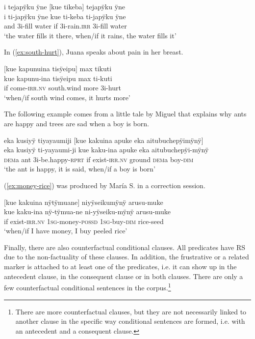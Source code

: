 \ea\label{ex:kuekue}
\begingl
\glpreamble i tejapÿku ÿne \textup{[}kue tikeba\textup{]} tejapÿku ÿne\\
\gla i ti-japÿku ÿne kue ti-keba ti-japÿku ÿne\\
\glb and 3i-fill water if 3i-rain.\textsc{irr} 3i-fill water\\
\glft ‘the water fills it there, when/if it rains, the water fills it’
\endgl
\trailingcitation{[jxx-p151020l-2]}
\xe

In (\ref{ex:south-hurt}), Juana speaks about pain in her breast. 

\ea\label{ex:south-hurt}
\begingl
\glpreamble \textup{[}kue kapunuina tisÿeipu\textup{]} max tikuti\\
\gla kue kapunu-ina tisÿeipu max ti-kuti\\
\glb if come-\textsc{irr.nv} south.wind more 3i-hurt\\
\glft ‘when/if south wind comes, it hurts more’
\endgl
\trailingcitation{[jxx-p120430l-1.326]}
\xe

The following example comes from a little tale by Miguel that explains why ants are happy and trees are sad when a boy is born.

\newpage
\ea\label{ex:happy-born}
\begingl
\glpreamble eka kusiyÿ tiyayaumiji \textup{[}kue kakuina apuke eka aitubuchepÿimÿnÿ\textup{]}\\
\gla eka kusiyÿ ti-yayaumi-ji kue kaku-ina apuke eka aitubuchepÿi-mÿnÿ\\
\glb \textsc{dem}a ant 3i-be.happy-\textsc{rprt} if exist-\textsc{irr.nv} ground \textsc{dem}a boy-\textsc{dim}\\
\glft ‘the ant is happy, it is said, when/if a boy is born’
\endgl
{}
\xe

(\ref{ex:money-rice}) was produced by María S. in a correction session.

\ea\label{ex:money-rice}
\begingl
\glpreamble \textup{[}kue kakuina nÿtÿmuane\textup{]} niyÿseikumÿnÿ arusu-muke\\
\gla kue kaku-ina nÿ-tÿmua-ne ni-yÿseiku-mÿnÿ arusu-muke\\
\glb if exist-\textsc{irr.nv} 1\textsc{sg}-money-\textsc{possd} 1\textsc{sg}-buy-\textsc{dim} rice-seed\\
\glft ‘when/if I have money, I buy peeled rice’
\endgl
\trailingcitation{[rxx-e121128s-3.28]}
\xe

Finally, there are also counterfactual conditional clauses. All predicates have  RS due to the non-factuality of these clauses. In addition, the frustrative or a related marker is attached to at least one of the predicates, i.e. it can show up in the antecedent clause, in the consequent clause or in both clauses. There are only a few counterfactual conditional sentences in the corpus.\footnote{There are more counterfactual clauses, but they are not necessarily linked to another clause in the specific way conditional sentences are formed, i.e. with an antecedent and a consequent clause.} 

